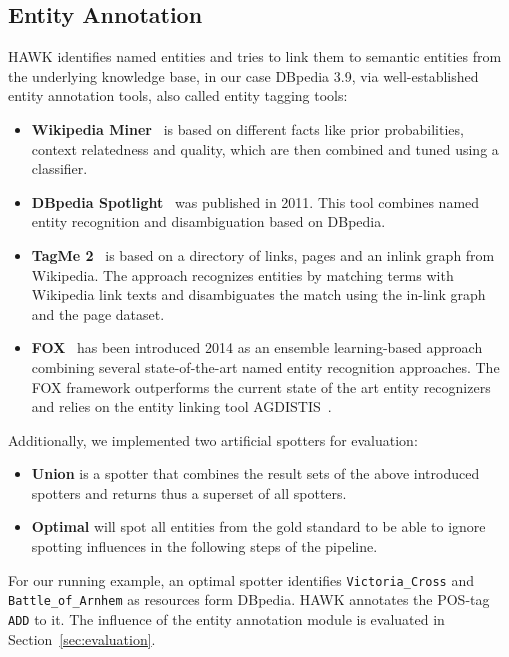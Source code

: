 \subsection{Entity Annotation}
HAWK identifies named entities and tries to link them to semantic entities from the underlying knowledge base, in our case DBpedia 3.9, via well-established entity annotation tools, also called entity tagging tools:
\begin{itemize}
\item \textbf{Wikipedia Miner}~\cite{milne2008learning} is based on different facts like prior probabilities, context relatedness and quality, which are then combined and tuned using a classifier.
\item \textbf{DBpedia Spotlight}~\cite{spotlight} %
was published in 2011. 
This tool combines named entity recognition and disambiguation based on DBpedia.
\item \textbf{TagMe 2}~\cite{TagMe2} is based on a directory of links, pages and an inlink graph from Wikipedia.
The approach recognizes entities by matching terms with Wikipedia link texts and disambiguates the match using the in-link graph and the page dataset.
\item \textbf{FOX}~\cite{FOX} has been introduced 2014 as an ensemble learning-based approach combining several state-of-the-art named entity recognition approaches. 
The FOX framework outperforms the current state of the art entity recognizers and relies on the entity linking tool AGDISTIS~\cite{AGDISTIS_ISWC}.
\end{itemize}
Additionally, we implemented two artificial spotters for evaluation:
\begin{itemize}
\item \textbf{Union} is a spotter that combines the result sets of the above introduced spotters and returns thus a superset of all spotters.
\item \textbf{Optimal} will spot all entities from the gold standard to be able to ignore spotting influences in the following steps of the pipeline.
\end{itemize}

For our running example, an optimal spotter identifies \texttt{Victoria\_Cross} and \texttt{Battle\_of\_Arnhem} as resources form DBpedia.
HAWK annotates the POS-tag \texttt{ADD} to it. %
The influence of the entity annotation module is evaluated in Section~\ref{sec:evaluation}.

